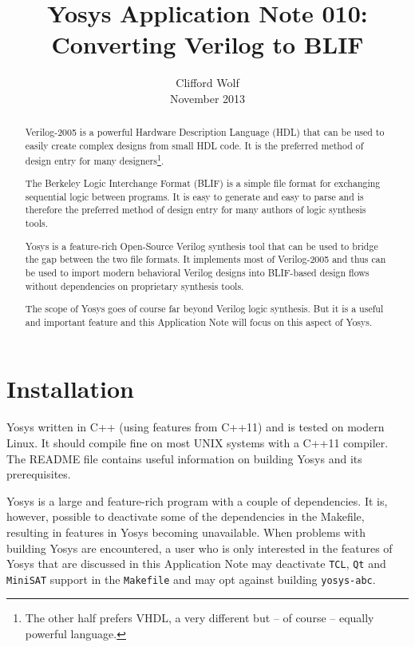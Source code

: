\documentclass[9pt,technote,a4paper]{IEEEtran}
\begin{document}
\title{Yosys Application Note 010: \\ Converting Verilog to BLIF}
\author{Clifford Wolf \\ November 2013}
\maketitle

\begin{abstract}
Verilog-2005 is a powerful Hardware Description Language (HDL) that can be used
to easily create complex designs from small HDL code. It is the preferred
method of design entry for many designers\footnote{The other half prefers VHDL,
a very different but -- of course -- equally powerful language.}.

The Berkeley Logic Interchange Format (BLIF) \cite{blif} is a simple file format for
exchanging sequential logic between programs. It is easy to generate and
easy to parse and is therefore the preferred method of design entry for
many authors of logic synthesis tools.

Yosys \cite{yosys} is a feature-rich
Open-Source Verilog synthesis tool that can be used to bridge the gap between
the two file formats. It implements most of Verilog-2005 and thus can be used
to import modern behavioral Verilog designs into BLIF-based design flows
without dependencies on proprietary synthesis tools.

The scope of Yosys goes of course far beyond Verilog logic synthesis. But
it is a useful and important feature and this Application Note will focus
on this aspect of Yosys.
\end{abstract}

\section{Installation}

Yosys written in C++ (using features from C++11) and is tested on modern Linux.
It should compile fine on most UNIX systems with a C++11 compiler. The README
file contains useful information on building Yosys and its prerequisites.

Yosys is a large and feature-rich program with a couple of dependencies. It is,
however, possible to deactivate some of the dependencies in the Makefile,
resulting in features in Yosys becoming unavailable. When problems with building
Yosys are encountered, a user who is only interested in the features of Yosys
that are discussed in this Application Note may deactivate {\tt TCL}, {\tt Qt}
and {\tt MiniSAT} support in the {\tt Makefile} and may opt against building
{\tt yosys-abc}.
\end{document}

